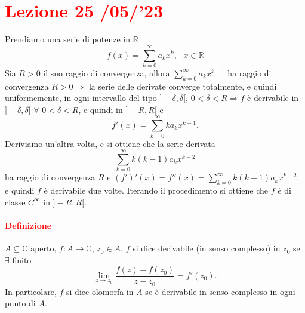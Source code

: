 \documentclass{article}
\newcommand{\R}{\mathbb{R}}
\newcommand{\C}{\mathbb{C}}
\begin{document}
\newpage
\section{\textcolor{red}{Lezione 25 \space{}/05/'23}}
Prendiamo una serie di potenze in $\R$
\begin{equation*}
    f(x)=\sum_{k=0}^{\infty}a_kx^k,\,\,\,\, x \in \R
\end{equation*}
Sia $R>0$ il suo raggio di convergenza, allora $\sum_{k=0}^{\infty}a_kx^{k-1}$ ha raggio di convergenza $R>0 \Rightarrow$ la serie delle derivate converge totalmente, e quindi uniformemente, in ogni intervallo del tipo $]-\delta,\delta[$, $0<\delta<R \Rightarrow f$ è derivabile in $]-\delta,\delta[\,\,\forall\,\, 0<\delta<R$, e quindi in $]-R,R[$ e 
\begin{equation*}
    f'(x)=\sum_{k=0}^{\infty}ka_kx^{k-1}.
\end{equation*}
Deriviamo un'altra volta, e si ottiene che la serie derivata
\begin{equation*}
    \sum_{k=0}^{\infty} k(k-1)a_kx^{k-2}
\end{equation*}
ha raggio di convergenza $R$ e $(f')'(x)=f''(x)=\sum_{k=0}^{\infty} k(k-1)a_kx^{k-2}$, e quindi $f$ è derivabile due volte. Iterando il procedimento si ottiene che $f$ è di classe $C^\infty$ in $]-R,R[$.

\paragraph{\textcolor{red}{Definizione}}
$A \subseteq \C$ aperto, $f:A\rightarrow \C$, $z_0\in A$. $f$ si dice derivabile (in senso complesso) in $z_0$ se $\exists$ finito 
\begin{equation*}
    \lim_{z \rightarrow z_0} \frac{f(z)-f(z_0)}{z-z_0}=f'(z_0).
\end{equation*}
In particolare, $f$ si dice \underline{olomorfa} in $A$ se è derivabile in senso complesso in ogni punto di $A$.
\end{document}
